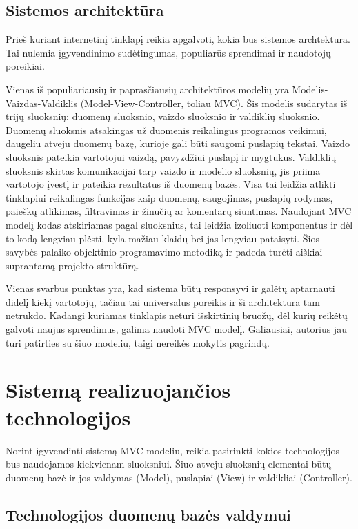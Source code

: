 \documentclass{VUMIFPSkursinis}
\begin{document}
\subsection{Sistemos architektūra}
Prieš kuriant internetinį tinklapį reikia apgalvoti, kokia bus sistemos archtektūra. Tai nulemia įgyvendinimo sudėtingumas, populiarūs sprendimai ir naudotojų poreikiai.

Vienas iš populiariausių ir paprasčiausių architektūros modelių yra Modelis-Vaizdas-Valdiklis (Model-View-Controller, toliau MVC)\cite{MVCDefinition}. Šis modelis sudarytas iš trijų sluoksnių: duomenų sluoksnio, vaizdo sluoksnio ir valdiklių sluoksnio. Duomenų sluoksnis atsakingas už duomenis reikalingus programos veikimui, daugeliu atveju duomenų bazę, kurioje gali būti saugomi puslapių tekstai\cite{MVCSO3}. Vaizdo sluoksnis pateikia vartotojui vaizdą, pavyzdžiui puslapį ir mygtukus. Valdiklių sluoksnis skirtas komunikacijai tarp vaizdo ir modelio sluoksnių, jis priima vartotojo įvestį ir pateikia rezultatus iš duomenų bazės. Visa tai leidžia atlikti tinklapiui reikalingas funkcijas kaip duomenų, saugojimas, puslapių rodymas, paieškų atlikimas, filtravimas ir žinučių ar komentarų siuntimas. Naudojant MVC modelį kodas atskiriamas pagal sluoksnius, tai leidžia izoliuoti komponentus ir dėl to kodą lengviau plėsti, kyla mažiau klaidų bei jas lengviau pataisyti. Šios savybės palaiko objektinio programavimo metodiką ir padeda turėti aiškiai suprantamą projekto struktūrą.

Vienas svarbus punktas yra, kad sistema būtų responsyvi ir galėtų aptarnauti didelį kiekį vartotojų, tačiau tai universalus poreikis ir ši architektūra tam netrukdo. Kadangi kuriamas tinklapis neturi išskirtinių bruožų, dėl kurių reikėtų galvoti naujus sprendimus, galima naudoti MVC modelį\cite{MVCSO1, MVCSO2}. Galiausiai, autorius jau turi patirties su šiuo modeliu, taigi nereikės mokytis pagrindų.

\section{Sistemą realizuojančios technologijos}
Norint įgyvendinti sistemą MVC modeliu, reikia pasirinkti kokios technologijos bus naudojamos kiekvienam sluoksniui. Šiuo atveju sluoksnių elementai būtų duomenų bazė ir jos valdymas (Model), puslapiai (View) ir valdikliai (Controller).

\subsection{Technologijos duomenų bazės valdymui}
\end{document}
